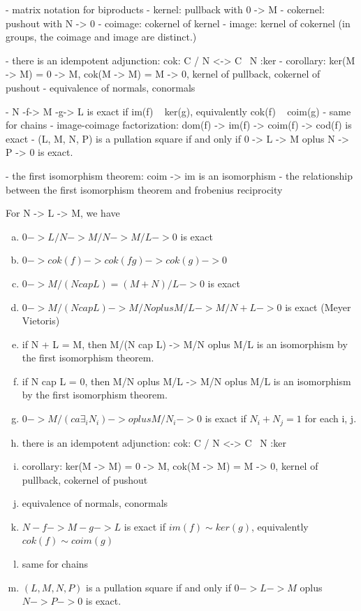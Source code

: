 \documentclass{book}
\theoremstyle{definition}
\begin{document}
\iffalse
- matrix notation for biproducts
- kernel: pullback with  0 -> M
- cokernel: pushout with N -> 0
- coimage: cokernel of kernel
- image: kernel of cokernel (in groups, the coimage and image are distinct.)

- there is an idempotent adjunction: cok: C / N <-> C \ N :ker
- corollary: ker(M -> M) = 0 -> M, cok(M -> M) = M -> 0, kernel of pullback, cokernel of pushout
- equivalence of normals, conormals

- N -f-> M -g-> L is exact if im(f) ~ ker(g), equivalently cok(f) ~ coim(g)
- same for chains
- image-coimage factorization: dom(f) -> im(f) -> coim(f) -> cod(f) is exact
- (L, M, N, P) is a pullation square if and only if 0 -> L -> M oplus N -> P -> 0 is exact.

- the first isomorphism theorem: coim -> im is an isomorphism
- the relationship between the first isomorphism theorem and frobenius reciprocity

For N -> L -> M, we have
\begin{enumerate}[(a)]
\item $0 -> L/N -> M/N -> M / L -> 0$ is exact
\item $0 -> cok(f) -> cok(fg) -> cok(g) -> 0$
\item $0 -> M/(N cap L) = (M+N)/L -> 0$ is exact
\item $0 -> M/(N cap L) -> M/N oplus M/L -> M / N+L -> 0$ is exact (Meyer Vietoris)
\item if N + L = M,  then M/(N cap L) -> M/N oplus M/L is an isomorphism by the first isomorphism theorem.
\item if N cap L = 0,  then M/N oplus M/L -> M/N oplus M/L is an isomorphism by the first isomorphism theorem.
\item $0 -> M/(ca∃_i N_i) -> oplus M/N_i -> 0$ is exact if $N_i + N_j = 1$ for each i, j.
\item there is an idempotent adjunction: cok: C / N <-> C \ N :ker
\item corollary: ker(M -> M) = 0 -> M, cok(M -> M) = M -> 0, kernel of pullback, cokernel of pushout
\item equivalence of normals, conormals
\item $N -f-> M -g-> L$ is exact if $im(f) \sim ker(g)$, equivalently $cok(f) \sim coim(g)$
\item same for chains
\item $(L, M, N, P)$ is a pullation square if and only if $0 -> L -> M$ oplus $N -> P -> 0$ is exact.
\end{enumerate}
\end{document}
